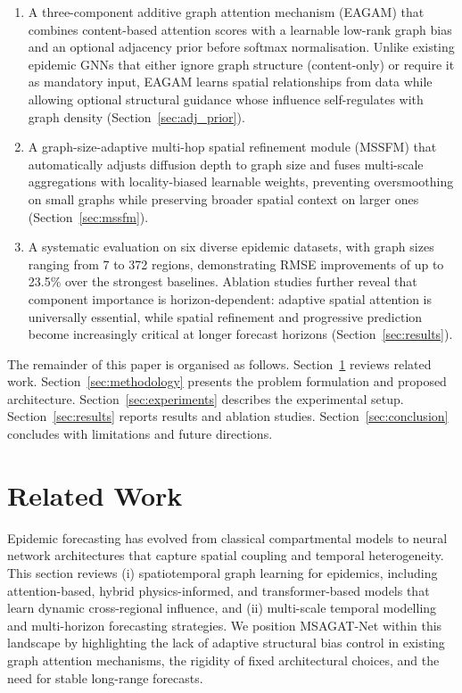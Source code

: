 \documentclass[a4paper,fleqn]{cas-dc}
\begin{document}
\begin{enumerate}
    \item A three-component additive graph attention mechanism (EAGAM) that combines content-based attention scores with a learnable low-rank graph bias and an optional adjacency prior before softmax normalisation. Unlike existing epidemic GNNs that either ignore graph structure (content-only) or require it as mandatory input, EAGAM learns spatial relationships from data while allowing optional structural guidance whose influence self-regulates with graph density (Section~\ref{sec:adj_prior}).

    \item A graph-size-adaptive multi-hop spatial refinement module (MSSFM) that automatically adjusts diffusion depth to graph size and fuses multi-scale aggregations with locality-biased learnable weights, preventing oversmoothing on small graphs while preserving broader spatial context on larger ones (Section~\ref{sec:mssfm}).

    \item A systematic evaluation on six diverse epidemic datasets, with graph sizes ranging from 7 to 372 regions, demonstrating RMSE improvements of up to 23.5\% over the strongest baselines. Ablation studies further reveal that component importance is horizon-dependent: adaptive spatial attention is universally essential, while spatial refinement and progressive prediction become increasingly critical at longer forecast horizons (Section~\ref{sec:results}).
\end{enumerate}

The remainder of this paper is organised as follows. Section~\ref{sec:related_work} reviews related work. Section~\ref{sec:methodology} presents the problem formulation and proposed architecture. Section~\ref{sec:experiments} describes the experimental setup. Section~\ref{sec:results} reports results and ablation studies. Section~\ref{sec:conclusion} concludes with limitations and future directions.

\section{Related Work}
\label{sec:related_work} 

Epidemic forecasting has evolved from classical compartmental models to neural network architectures that capture spatial coupling and temporal heterogeneity. This section reviews (i) spatiotemporal graph learning for epidemics, including attention-based, hybrid physics-informed, and transformer-based models that learn dynamic cross-regional influence, and (ii) multi-scale temporal modelling and multi-horizon forecasting strategies. We position MSAGAT-Net within this landscape by highlighting the lack of adaptive structural bias control in existing graph attention mechanisms, the rigidity of fixed architectural choices, and the need for stable long-range forecasts.
\end{document}
